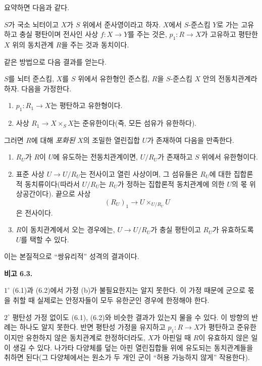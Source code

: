 요약하면 다음과 같다.

 $S$가 국소 뇌터이고 $X$가 $S$ 위에서 준사영이라고
하자. $X$에서 $S$-준스킴 $Y$로 가는 고유하고 충실 평탄이며 전사인 사상
$f:X\to Y$를 주는 것은, $p_1:R\to X$가 고유하고 평탄한 $X$ 위의
동치관계 $R$을 주는 것과 동치이다.

같은 방법으로 다음 결과를 얻는다.

 $S$를 뇌터 준스킴, $X$를 $S$ 위에서 유한형인
준스킴, $R$을 $S$-준스킴 $X$ 안의 전동치관계라 하자. 다음을 가정한다.
\begin{enumerate}
\item[(a)] $p_1:R_1\to X$는 평탄하고 유한형이다.
\item[(b)] 사상 $R_1\to X\times_S X$는 준유한이다(즉, 모든 섬유가
유한하다).
\end{enumerate}
그러면 $R$에 대해 \emph{포화된} $X$의 조밀한 열린집합 $U$가 존재하여
다음을 만족한다.
\begin{enumerate}
\item[(i)] $R_U$가 $R$이 $U$에 유도하는 전동치관계이면, $U/R_U$가
존재하고 $S$ 위에서 유한형이다.

\item[(ii)] 표준 사상 $U\to U/R_U$는 전사이고 열린 사상이며, 그 섬유들은
$R_U$에 대한 집합론적 동치류이다(따라서 $U/R_U$는 $R_U$가 정하는
집합론적 동치관계에 의한 $U$의 몫 위상공간이다). 끝으로 사상
\[
  (R_U)_1\longrightarrow U\times_{U/R_U}U
\]
은 전사이다.

\item[(iii)] $R$이 동치관계에서 오는 경우에는, $U\to U/R_U$가 충실
평탄이고 $R_U$가 유효하도록 $U$를 택할 수 있다.
\end{enumerate}

이는 본질적으로 ``쌍유리적'' 성격의 결과이다.

\medskip
\noindent\textbf{비고 6.3.}

\smallskip
\noindent $1^\circ$ (6.1)과 (6.2)에서 가정 (b)가 불필요한지는 알지
못한다. 이 가정 때문에 군으로 몫을 취할 때 실제로는 안정자들이 모두
유한군인 경우에 한정해야 한다.

\smallskip
\noindent $2^\circ$ 평탄성 가정 없이도 (6.1), (6.2)와 비슷한 결과가
있는지 물을 수 있다. 이 방향의 반례는 하나도 알지 못한다. 반면 평탄성
가정을 유지하고 $p_1:R\to X$가 평탄하고 준유한이지만 유한하지 않은
동치관계로 한정하더라도, $X$가 아핀일 때 $R$이 유효하지 않은 일이 생길
수 있다. 나가타 다양체를 덮는 아핀 열린집합들 위에 유도되는 동치관계들을
취하면 된다(그 다양체에서는 원소가 두 개인 군이 ``허용 가능하지 않게''
작용한다).

